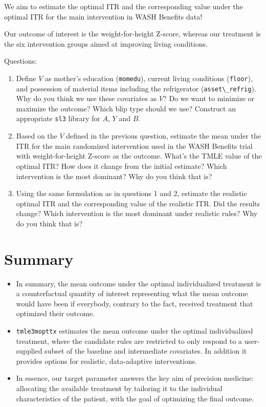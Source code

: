\documentclass[
  12pt, krantz2,
]{book}
\newcommand{\passthrough}[1]{#1}
\theoremstyle{definition}
\theoremstyle{definition}
\theoremstyle{definition}
\newcommand{\1}{\mathbbm{1}}
\begin{document}
We aim to estimate the optimal ITR and the corresponding value under the optimal ITR
for the main intervention in WASH Benefits data!

Our outcome of interest is the weight-for-height Z-score, whereas our treatment is
the six intervention groups aimed at improving living conditions.

Questions:

\begin{enumerate}
\def\labelenumi{\arabic{enumi}.}
\item
  Define \(V\) as mother's education (\passthrough{\lstinline!momedu!}), current living conditions (\passthrough{\lstinline!floor!}),
  and possession of material items including the refrigerator (\passthrough{\lstinline!asset\_refrig!}).
  Why do you think we use these covariates as \(V\)?
  Do we want to minimize or maximize the outcome? Which blip type should we use?
  Construct an appropriate \passthrough{\lstinline!sl3!} library for \(A\), \(Y\) and \(B\).
\item
  Based on the \(V\) defined in the previous question, estimate the mean under the ITR for
  the main randomized intervention used in the WASH Benefits trial
  with weight-for-height Z-score as the outcome. What's the TMLE value of the optimal ITR?
  How does it change from the initial estimate? Which intervention is the most dominant?
  Why do you think that is?
\item
  Using the same formulation as in questions 1 and 2, estimate the realistic optimal ITR
  and the corresponding value of the realistic ITR. Did the results change? Which intervention
  is the most dominant under realistic rules? Why do you think that is?
\end{enumerate}

\hypertarget{summary-1}{%
\section{Summary}\label{summary-1}}

\begin{itemize}
\item
  In summary, the mean outcome under the optimal individualized treatment is a counterfactual
  quantity of interest representing what the mean outcome would have been if everybody, contrary
  to the fact, received treatment that optimized their outcome.
\item
  \passthrough{\lstinline!tmle3mopttx!} estimates the mean outcome under the optimal individualized treatment, where the candidate
  rules are restricted to only respond to a user-supplied subset of the baseline and intermediate
  covariates. In addition it provides options for realistic, data-adaptive interventions.
\item
  In essence, our target parameter answers the key aim of precision medicine: allocating
  the available treatment by tailoring it to the individual characteristics of the patient, with the
  goal of optimizing the final outcome.
\end{itemize}
\end{document}
